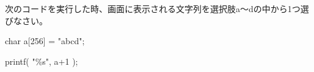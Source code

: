 次のコードを実行した時、画面に表示される文字列を選択肢a〜dの中から1つ選びなさい。\par
\noindent char a[256] = "abcd"; \par
\noindent printf( "\%s", a+1 ); \par
